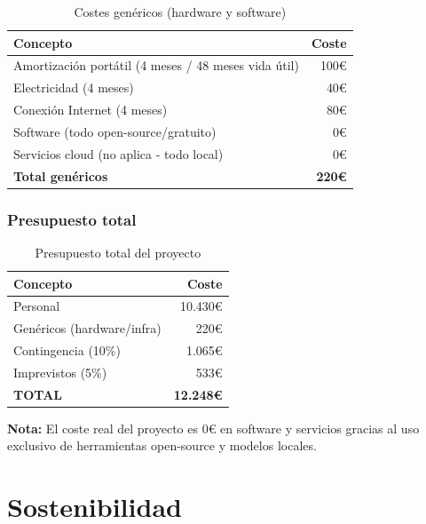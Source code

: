 \documentclass[12pt, a4paper, twoside]{report}
\begin{document}
\begin{table}[H]
\centering
\caption{Costes gen\'ericos (hardware y software)}
\label{tab:costes-genericos}
\begin{tabular}{lr}
\toprule
\textbf{Concepto} & \textbf{Coste} \\
\midrule
Amortizaci\'on port\'atil (4 meses / 48 meses vida \'util) & 100\euro \\
Electricidad (4 meses) & 40\euro \\
Conexi\'on Internet (4 meses) & 80\euro \\
Software (todo open-source/gratuito) & 0\euro \\
Servicios cloud (no aplica - todo local) & 0\euro \\
\midrule
\textbf{Total gen\'ericos} & \textbf{220\euro} \\
\bottomrule
\end{tabular}
\end{table}

\subsection{Presupuesto total}

\begin{table}[H]
\centering
\caption{Presupuesto total del proyecto}
\label{tab:presupuesto-total}
\begin{tabular}{lr}
\toprule
\textbf{Concepto} & \textbf{Coste} \\
\midrule
Personal & 10.430\euro \\
Gen\'ericos (hardware/infra) & 220\euro \\
Contingencia (10\%) & 1.065\euro \\
Imprevistos (5\%) & 533\euro \\
\midrule
\textbf{TOTAL} & \textbf{12.248\euro} \\
\bottomrule
\end{tabular}
\end{table}

\textbf{Nota:} El coste real del proyecto es 0\euro{} en software y servicios gracias al uso exclusivo de herramientas open-source y modelos locales.


\chapter{Sostenibilidad}
\label{ch:sostenibilidad}
\end{document}
